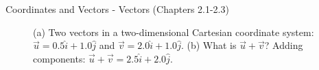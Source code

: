 \documentclass{beamer}
\begin{document}
\begin{frame}{Coordinates and Vectors - Vectors (Chapters 2.1-2.3)}
\begin{figure}
\centering
{}
\caption{\label{fig:twovectors} (a) Two vectors in a two-dimensional Cartesian coordinate system: $\vec{u} = 0.5\hat{i}+1.0\hat{j}$ and $\vec{v} = 2.0\hat{i}+1.0\hat{j}$.  (b) What is $\vec{u}+\vec{v}$?  Adding components: $\vec{u}+\vec{v} = 2.5\hat{i}+2.0\hat{j}$.}
\end{figure}
\end{frame}
\end{document}
